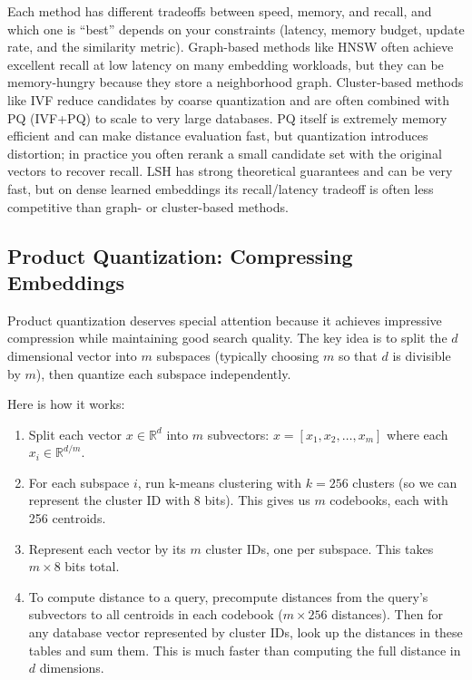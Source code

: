 \vspace{1em}

Each method has different tradeoffs between speed, memory, and recall, and which one is ``best'' depends on your constraints (latency, memory budget, update rate, and the similarity metric). Graph-based methods like HNSW often achieve excellent recall at low latency on many embedding workloads, but they can be memory-hungry because they store a neighborhood graph. Cluster-based methods like IVF reduce candidates by coarse quantization and are often combined with PQ (IVF+PQ) to scale to very large databases. PQ itself is extremely memory efficient and can make distance evaluation fast, but quantization introduces distortion; in practice you often rerank a small candidate set with the original vectors to recover recall. LSH has strong theoretical guarantees and can be very fast, but on dense learned embeddings its recall/latency tradeoff is often less competitive than graph- or cluster-based methods.

\vspace{1.5em}

\subsection{Product Quantization: Compressing Embeddings}

Product quantization deserves special attention because it achieves impressive compression while maintaining good search quality. The key idea is to split the $d$ dimensional vector into $m$ subspaces (typically choosing $m$ so that $d$ is divisible by $m$), then quantize each subspace independently.

\vspace{1em}

Here is how it works:

\begin{enumerate}
\item Split each vector $x \in \mathbb{R}^d$ into $m$ subvectors: $x = [x_1, x_2, \ldots, x_m]$ where each $x_i \in \mathbb{R}^{d/m}$.

\item For each subspace $i$, run k-means clustering with $k = 256$ clusters (so we can represent the cluster ID with 8 bits). This gives us $m$ codebooks, each with 256 centroids.

\item Represent each vector by its $m$ cluster IDs, one per subspace. This takes $m \times 8$ bits total.

\item To compute distance to a query, precompute distances from the query's subvectors to all centroids in each codebook ($m \times 256$ distances). Then for any database vector represented by cluster IDs, look up the distances in these tables and sum them. This is much faster than computing the full distance in $d$ dimensions.
\end{enumerate}

